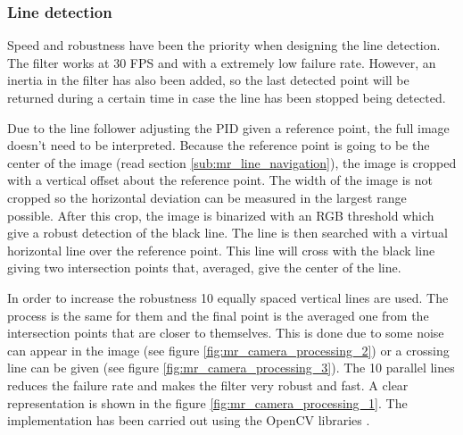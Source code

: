 	\subsubsection{Line detection} %
	\label{ssub:line_detection}
	Speed and robustness have been the priority when designing the line detection.
	The filter works at 30 FPS and with a extremely low failure rate.
	However, an inertia in the filter has also been added, so the last detected point will be returned during a certain time in case the line has been stopped being detected.

	Due to the line follower adjusting the PID given a reference point, the full image doesn't need to be interpreted.
	Because the reference point is going to be the center of the image (read section \ref{sub:mr_line_navigation}), the image is cropped with a vertical offset about the reference point.
	The width of the image is not cropped so the horizontal deviation can be measured in the largest range possible.
	After this crop, the image is binarized with an RGB threshold which give a robust detection of the black line.
	The line is then searched with a virtual horizontal line over the reference point.
	This line will cross with the black line giving two intersection points that, averaged, give the center of the line.

	In order to increase the robustness 10 equally spaced vertical lines are used. 
	The process is the same for them and the final point is the averaged one from the intersection points that are closer to themselves.
	This is done due to some noise can appear in the image (see figure \ref{fig:mr_camera_processing_2}) or a crossing line can be given (see figure \ref{fig:mr_camera_processing_3}).
	The 10 parallel lines reduces the failure rate and makes the filter very robust and fast.
	A clear representation is shown in the figure \ref{fig:mr_camera_processing_1}.
	The implementation has been carried out using the OpenCV libraries \cite{opencv}.
	

